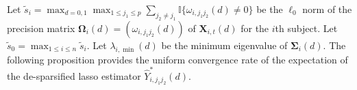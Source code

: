 \documentclass[12pt]{article}
\newtheorem{proposition}{Proposition}
\theoremstyle{definition}
\newcommand{\E}{\rm E}
\newcommand{\bX}{{\mathbf X}}
\newcommand{\bOmega}{\boldsymbol{\Omega}}
\newcommand{\bSigma}{\boldsymbol{\Sigma}}
\begin{document}



Let $\tilde{s}_i = \max_{d = 0, 1} \max_{1 \leq j_1 \leq p} \sum_{j_2 \neq j_1} \mathbb{I}\{\omega_{i, j_1j_2}(d) \neq 0\}$ be the $\ell_0$ norm of the precision matrix $\bOmega_{i}(d) = (\omega_{i, j_1j_2}(d))$ of 
$\bX_{i, t}(d)$ for the $i$th subject.
Let $\tilde{s}_0 = \max_{1 \leq i \leq n} \tilde{s}_i$.
Let $\lambda_{i, \min}(d)$ be the minimum eigenvalue of $\bSigma_{i}(d)$.
The following proposition provides the uniform convergence rate of the expectation of the de-sparsified lasso estimator $\hat{Y}_{i, j_1 j_2}^{\ast}(d)$. 
\end{document}
